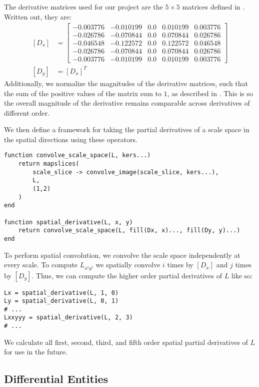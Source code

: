 \documentclass{article}
\begin{document}
The derivative matrices used for our project are the $5\times 5$ matrices defined in \cite{Ando}.
Written out, they are:
\begin{equation}
  \begin{aligned}
    [D_x] &=
    \begin{bmatrix}
      -0.003776 &-0.010199  &0.0  &0.010199  &0.003776 \\
      -0.026786 &-0.070844  &0.0  &0.070844  &0.026786 \\
      -0.046548 &-0.122572  &0.0  &0.122572  &0.046548 \\
      -0.026786 &-0.070844  &0.0  &0.070844  &0.026786 \\
      -0.003776 &-0.010199  &0.0  &0.010199  &0.003776
    \end{bmatrix} \\
    [D_y] &= [D_x]^T
  \end{aligned}
\end{equation}
Additionally, we normalize the magnitudes of the derivative matrices, such that the sum of the positive values of the matrix sum to $1$, as described in \cite{Lindeberg1993}.
This is so the overall magnitude of the derivative remains comparable across derivatives of different order.

We then define a framework for taking the partial derivatives of a scale space in the spatial directions using these operators.
\begin{lstlisting}
function convolve_scale_space(L, kers...)
    return mapslices(
        scale_slice -> convolve_image(scale_slice, kers...),
        L,
        (1,2)
    )
end

function spatial_derivative(L, x, y)
    return convolve_scale_space(L, fill(Dx, x)..., fill(Dy, y)...)
end
\end{lstlisting}
To perform spatial convolution, we convolve the scale space independently at every scale.
To compute $L_{x^iy^j}$ we spatially convolve $i$ times by $[D_x]$ and $j$ times by $[D_y]$.
Thus, we can compute the higher order partial derivatives of $L$ like so:
\begin{lstlisting}
Lx = spatial_derivative(L, 1, 0)
Ly = spatial_derivative(L, 0, 1)
# ...
Lxxyyy = spatial_derivative(L, 2, 3)
# ...
\end{lstlisting}
We calculate all first, second, third, and fifth order spatial partial derivatives of $L$ for use in the future.

\subsection{Differential Entities}
\end{document}
